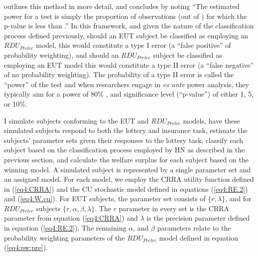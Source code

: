 \documentclass[../main.tex]{subfiles}
\begin{document}
\textcite[109]{Feiveson2002} outlines this method in more detail, and concludes by noting \enquote{The estimated power for a  test is simply the proportion of observations (out of ) for which the p-value is less than .}
In this framework, and given the nature of the classification process defined previously, should an EUT subject be classified as employing an $\mathit{RDU_{Prelec}}$ model, this would constitute a type I error (a \enquote{false positive} of probability weighting), and should an $\mathit{RDU_{Prelec}}$ subject be classified as employing an EUT model this would constitute a type II error (a \enquote{false negative} of no probability weighting).
The probability of a type II error is called the \enquote{power} of the test and when researchers engage in \textit{ex ante} power analysis, they typically aim for a power of 80\% \parencite{Cohen1988, Gelman2014}, and significance level (\enquote{p-value}) of either 1, 5, or 10\%.

I simulate subjects conforming to the EUT and $\mathit{RDU_{Prelec}}$ models, have these simulated subjects respond to both the lottery and insurance task, estimate the subjects' parameter sets given their responses to the lottery task, classify each subject based on the classification process employed by HN as described in the previous section, and calculate the welfare surplus for each subject based on the winning model.{\footnotemark}
A simulated subject is represented by a single parameter set and an assigned model.
For each model, we employ the CRRA utility function defined in (\ref{eq4:CRRA}) and the CU stochastic model defined in equations (\ref{eq4:RE.2}) and (\ref{eq4:W.cu}).
For EUT subjects, the parameter set consists of $\lbrace r, \lambda \rbrace$, and for $\mathit{RDU_{Prelec}}$ subjects $\lbrace r, \alpha, \beta, \lambda \rbrace$.
The $r$ parameter in every set is the CRRA parameter from equation (\ref{eq4:CRRA}) and $\lambda$ is the precision parameter defined in equation (\ref{eq4:RE.2}).
The remaining $\alpha$, and $\beta$ parameters relate to the probability weighting parameters of the $\mathit{RDU_{Prelec}}$ model defined in equation (\ref{eq4:pw:pre}).

\addtocounter{footnote}{-1}
\end{document}
